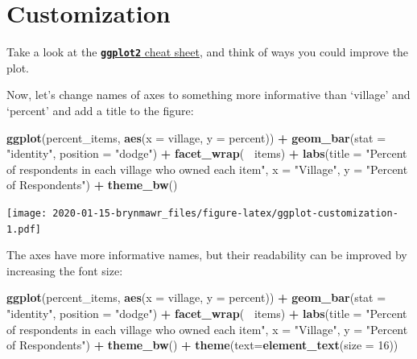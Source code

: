 \documentclass[]{book}
\newenvironment{Shaded}{\begin{snugshade}}{\end{snugshade}}
\newcommand{\KeywordTok}[1]{\textcolor[rgb]{0.13,0.29,0.53}{\textbf{#1}}}
\newcommand{\DataTypeTok}[1]{\textcolor[rgb]{0.13,0.29,0.53}{#1}}
\newcommand{\DecValTok}[1]{\textcolor[rgb]{0.00,0.00,0.81}{#1}}
\newcommand{\StringTok}[1]{\textcolor[rgb]{0.31,0.60,0.02}{#1}}
\newcommand{\OperatorTok}[1]{\textcolor[rgb]{0.81,0.36,0.00}{\textbf{#1}}}
\newcommand{\NormalTok}[1]{#1}
\begin{document}
\section{Customization}\label{customization}

Take a look at the
\href{https://www.rstudio.com/wp-content/uploads/2016/11/ggplot2-cheatsheet-2.1.pdf}{\textbf{\texttt{ggplot2}}
cheat sheet}, and think of ways you could improve the plot.

Now, let's change names of axes to something more informative than
`village' and `percent' and add a title to the figure:

\begin{Shaded}
\begin{Highlighting}[]
\KeywordTok{ggplot}\NormalTok{(percent_items, }\KeywordTok{aes}\NormalTok{(}\DataTypeTok{x =}\NormalTok{ village, }\DataTypeTok{y =}\NormalTok{ percent)) }\OperatorTok{+}
\StringTok{    }\KeywordTok{geom_bar}\NormalTok{(}\DataTypeTok{stat =} \StringTok{"identity"}\NormalTok{, }\DataTypeTok{position =} \StringTok{"dodge"}\NormalTok{) }\OperatorTok{+}
\StringTok{    }\KeywordTok{facet_wrap}\NormalTok{(}\OperatorTok{~}\StringTok{ }\NormalTok{items) }\OperatorTok{+}
\StringTok{    }\KeywordTok{labs}\NormalTok{(}\DataTypeTok{title =} \StringTok{"Percent of respondents in each village who owned each item"}\NormalTok{,}
         \DataTypeTok{x =} \StringTok{"Village"}\NormalTok{,}
         \DataTypeTok{y =} \StringTok{"Percent of Respondents"}\NormalTok{) }\OperatorTok{+}
\StringTok{    }\KeywordTok{theme_bw}\NormalTok{()}
\end{Highlighting}
\end{Shaded}

\texttt{[image: 2020-01-15-brynmawr\_files/figure-latex/ggplot-customization-1.pdf]}

The axes have more informative names, but their readability can be
improved by increasing the font size:

\begin{Shaded}
\begin{Highlighting}[]
\KeywordTok{ggplot}\NormalTok{(percent_items, }\KeywordTok{aes}\NormalTok{(}\DataTypeTok{x =}\NormalTok{ village, }\DataTypeTok{y =}\NormalTok{ percent)) }\OperatorTok{+}
\StringTok{    }\KeywordTok{geom_bar}\NormalTok{(}\DataTypeTok{stat =} \StringTok{"identity"}\NormalTok{, }\DataTypeTok{position =} \StringTok{"dodge"}\NormalTok{) }\OperatorTok{+}
\StringTok{    }\KeywordTok{facet_wrap}\NormalTok{(}\OperatorTok{~}\StringTok{ }\NormalTok{items) }\OperatorTok{+}
\StringTok{    }\KeywordTok{labs}\NormalTok{(}\DataTypeTok{title =} \StringTok{"Percent of respondents in each village who owned each item"}\NormalTok{,}
         \DataTypeTok{x =} \StringTok{"Village"}\NormalTok{,}
         \DataTypeTok{y =} \StringTok{"Percent of Respondents"}\NormalTok{) }\OperatorTok{+}
\StringTok{    }\KeywordTok{theme_bw}\NormalTok{() }\OperatorTok{+}
\StringTok{    }\KeywordTok{theme}\NormalTok{(}\DataTypeTok{text=}\KeywordTok{element_text}\NormalTok{(}\DataTypeTok{size =} \DecValTok{16}\NormalTok{))}
\end{Highlighting}
\end{Shaded}
\end{document}
